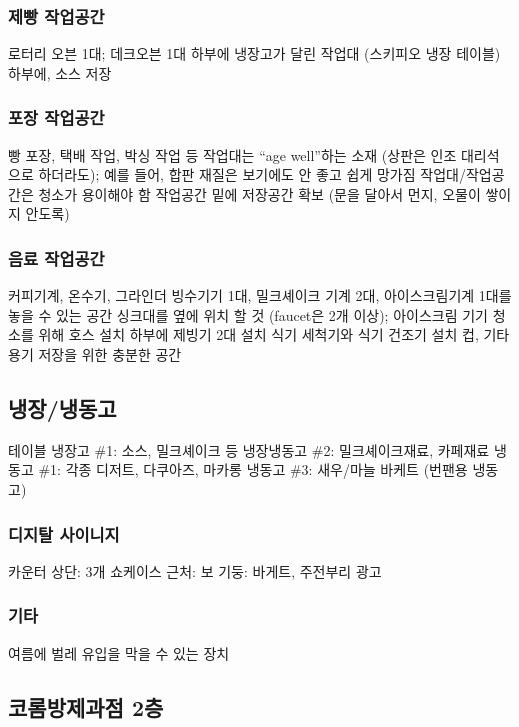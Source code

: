 \documentclass{myproc}
\begin{document}
\subsubsection{제빵 작업공간}
\bit
\w 로터리 오븐 1대; 데크오븐 1대
\w 하부에 냉장고가 달린 작업대 (스키피오 냉장 테이블)
\w 하부에, 소스 저장
\eit

\subsubsection{포장 작업공간}
\bit
\w 빵 포장, 택배 작업, 박싱 작업 등 
\w 작업대는 ``age well''하는 소재 (상판은 인조 대리석으로 하더라도); 예를
들어, 합판 재질은  보기에도 안 좋고 쉽게 망가짐
\w 작업대/작업공간은 청소가 용이해야 함
\w 작업공간 밑에 저장공간 확보 (문을 달아서 먼지, 오물이 쌓이지 안도록)
\eit

\subsubsection{음료 작업공간}
\bit
\w 커피기계, 온수기, 그라인더
\w 빙수기기 1대, 밀크셰이크 기계 2대, 아이스크림기계 1대를 놓을 수 있는 공간
\w 싱크대를 옆에 위치 할 것 (faucet은 2개 이상);
아이스크림 기기 청소를 위해 호스 설치
\w \textcolor{red2}{하부에 제빙기 2대 설치}
\w \textcolor{red2}{식기 세척기와 식기 건조기 설치}
\w 컵, 기타 용기 저장을 위한 충분한 공간
\eit

\subsection{냉장/냉동고}
\bit
\w 테이블 냉장고 \#1: 소스, 밀크셰이크 등
\w 냉장냉동고 \#2: 밀크셰이크재료, 카페재료
\w 냉동고 \#1: 각종 디저트, 다쿠아즈, 마카롱
\w 냉동고 \#3: 새우/마늘 바케트 (번팬용 냉동고)
\eit

\subsubsection{디지탈 사이니지}
\bit
\w 카운터 상단: 3개
\w 쇼케이스 근처:
\w 보 기둥: 바게트, 주전부리 광고
\eit

\subsubsection{기타}
\bit
\w 여름에 벌레 유입을 막을 수 있는 장치 
\eit

\subsection{코롬방제과점 2층}
\end{document}
